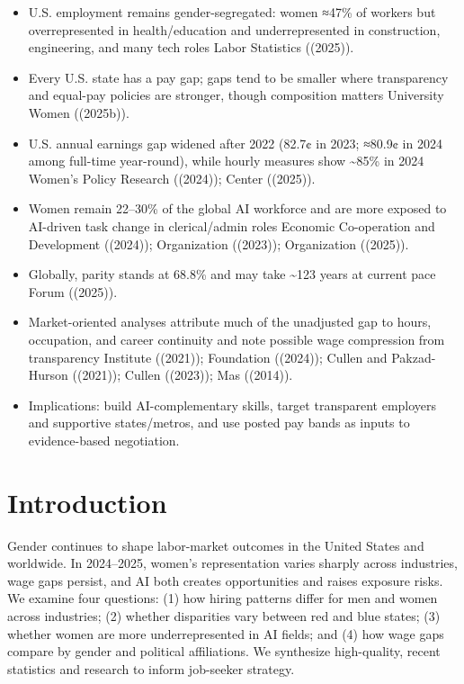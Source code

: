\documentclass[
  letterpaper,
  DIV=11,
  numbers=noendperiod]{scrartcl}
\providecommand{\tightlist}{%
  \setlength{\itemsep}{0pt}\setlength{\parskip}{0pt}}\usepackage{longtable,booktabs,array}
\begin{document}
\begin{itemize}
\tightlist
\item
  U.S. employment remains gender-segregated: women ≈47\% of workers but
  overrepresented in health/education and underrepresented in
  construction, engineering, and many tech roles Labor Statistics
  ((2025)).
\item
  Every U.S. state has a pay gap; gaps tend to be smaller where
  transparency and equal-pay policies are stronger, though composition
  matters University Women ((2025b)).
\item
  U.S. annual earnings gap widened after 2022 (82.7¢ in 2023; ≈80.9¢ in
  2024 among full-time year-round), while hourly measures show
  \textasciitilde85\% in 2024 Women's Policy Research ((2024)); Center
  ((2025)).
\item
  Women remain 22--30\% of the global AI workforce and are more exposed
  to AI-driven task change in clerical/admin roles Economic Co-operation
  and Development ((2024)); Organization ((2023)); Organization
  ((2025)).
\item
  Globally, parity stands at 68.8\% and may take \textasciitilde123
  years at current pace Forum ((2025)).
\item
  Market-oriented analyses attribute much of the unadjusted gap to
  hours, occupation, and career continuity and note possible wage
  compression from transparency Institute ((2021)); Foundation ((2024));
  Cullen and Pakzad-Hurson ((2021)); Cullen ((2023)); Mas ((2014)).
\item
  Implications: build AI-complementary skills, target transparent
  employers and supportive states/metros, and use posted pay bands as
  inputs to evidence-based negotiation.
\end{itemize}

\section{Introduction}\label{introduction}

Gender continues to shape labor-market outcomes in the United States and
worldwide. In 2024--2025, women's representation varies sharply across
industries, wage gaps persist, and AI both creates opportunities and
raises exposure risks. We examine four questions: (1) how hiring
patterns differ for men and women across industries; (2) whether
disparities vary between red and blue states; (3) whether women are more
underrepresented in AI fields; and (4) how wage gaps compare by gender
and political affiliations. We synthesize high-quality, recent
statistics and research to inform job-seeker strategy.
\end{document}
